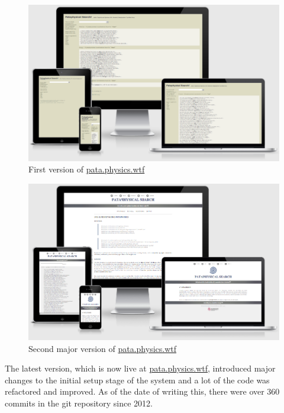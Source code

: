 \begin{figure}[!htbp] %
  \centering
  \includegraphics[width=\linewidth]{images/proto1screen}
\caption[First version of \url{pata.physics.wtf}]{First version of \url{pata.physics.wtf}}
\label{img:proto1screen}
\end{figure}

\begin{figure}[!htbp] %
  \centering
  \includegraphics[width=\linewidth]{images/proto2screen}
\caption[Second major version of \url{pata.physics.wtf}]{Second major version of \url{pata.physics.wtf}}
\label{img:proto2screen}
\end{figure}

The latest version, which is now live at \url{pata.physics.wtf}, introduced major changes to the initial setup stage of the system and a lot of the code was refactored and improved. As of the date of writing this, there were over 360 commits in the git repository since 2012.


\stopcontents[chapters]
